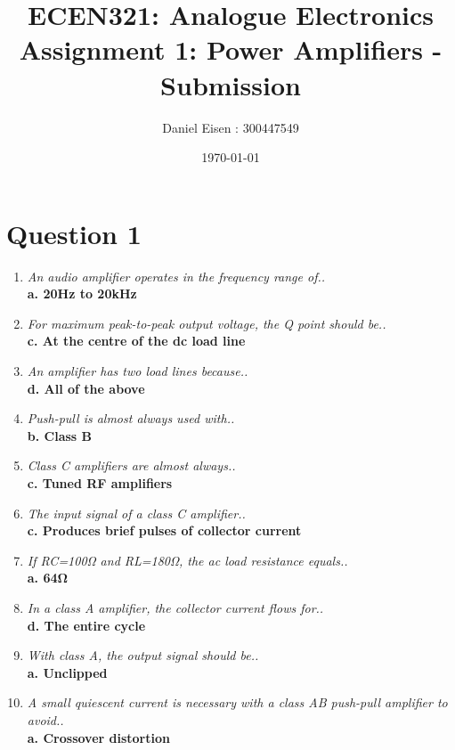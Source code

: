 \documentclass[11pt]{article}
\title{ECEN321: Analogue Electronics \\ Assignment 1: Power Amplifiers - Submission}
\author{Daniel Eisen : 300447549}
\date{\today}
\begin{document}
\maketitle
\section*{Question 1}
  \begin{enumerate}[label = \Roman*.]
          \item \textit{An audio amplifier operates in the frequency range of..} \\ 
          \textbf{a. 20Hz to 20kHz} 

          \item \textit{For maximum peak-to-peak output voltage, the Q point should be..} \\ 
          \textbf{c. At the centre of the dc load line}
          
          \item \textit{An amplifier has two load lines because..} \\ 
          \textbf{d. All of the above} 
          
          \item \textit{Push-pull is almost always used with..} \\ 
          \textbf{b. Class B} 
          
          \item \textit{Class C amplifiers are almost always..} \\ 
          \textbf{c. Tuned RF amplifiers} 
          
          \item \textit{The input signal of a class C amplifier..} \\ 
          \textbf{c. Produces brief pulses of collector current} 
          
          \item \textit{If RC=100Ω and RL=180Ω, the ac load resistance equals..} \\ 
          \textbf{a. 64Ω} 
          
          \item \textit{In a class A amplifier, the collector current flows for..} \\ 
          \textbf{d. The entire cycle} 
          
          \item \textit{With class A, the output signal should be..} \\ 
          \textbf{a. Unclipped} 
          
          \item \textit{A small quiescent current is necessary with a class AB push-pull amplifier to avoid..} \\ 
          \textbf{a. Crossover distortion} 
  \end{enumerate}
\end{document}
